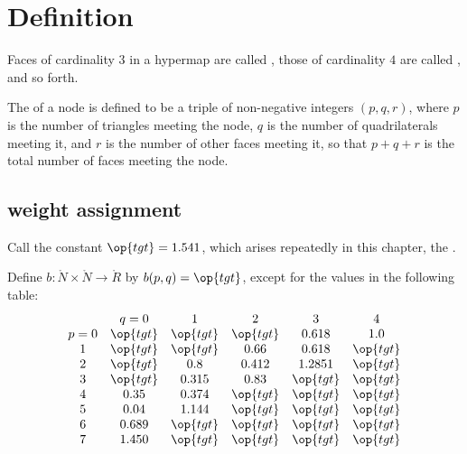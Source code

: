 \section{Definition}


\begin{definition}
  Faces of cardinality $3$ in a hypermap are called
  , those of cardinality $4$ are called
  , and so forth.
%
%
%
%
\end{definition}

\begin{definition}[type,~$(p,q,r)$]\label{definition:type}
The  of a node is defined to be a triple of
non-negative integers $(p,q,r)$, where $p$ is the number of
triangles meeting the node, $q$ is the number of quadrilaterals
meeting it, and $r$ is the number of other faces meeting it, so that
$p+q+r$ is the total number of faces meeting the node.
%
%
%
\end{definition}


\subsection{weight assignment}\label{sec:wtassign}
%

Call the constant $\op{tgt}=1.541$, which arises repeatedly in
this chapter, the . 
%
%
%


\begin{definition}[b]
Define $b:\ring{N}\times \ring{N}\to \ring{R}$ by $b(p,q)=\op{tgt}$,
except for the values in the following table:
{
\def\tx{\op{tgt}}
\begin{displaymath}\begin{matrix}  &q=0&1&2&3&4\\
p=0&\tx&\tx&\tx&0.618&1.0\\
1&\tx&\tx&0.66&0.618&\tx\\
2&\tx&0.8&0.412&1.2851&\tx\\
3&\tx&0.315&0.83&\tx&\tx\\
4&0.35&0.374&\tx&\tx&\tx\\
5&0.04&1.144&\tx&\tx&\tx\\
6&0.689&\tx&\tx&\tx&\tx\\
7&1.450&\tx&\tx&\tx&\tx
\end{matrix}
\end{displaymath}
}
%
\end{definition}


